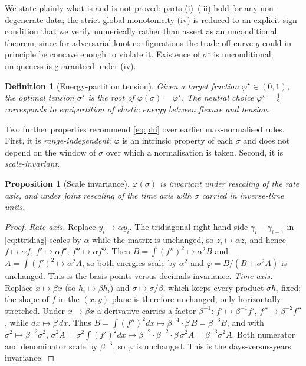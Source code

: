 \documentclass[10pt]{article}
\newtheorem{proposition}{Proposition}
\newtheorem{definition}{Definition}
\begin{document}
We state plainly what is and is not proved: parts (i)--(iii) hold for any non-degenerate data;
the strict global monotonicity (iv) is reduced to an explicit sign condition that we verify
numerically rather than assert as an unconditional theorem, since for adversarial knot
configurations the trade-off curve $g$ could in principle be concave enough to violate it.
Existence of $\sigma^\star$ is unconditional; uniqueness is guaranteed under (iv).

\begin{definition}[Energy-partition tension]
Given a target fraction $\varphi^\star\in(0,1)$, the optimal tension $\sigma^\star$ is the
root of $\varphi(\sigma)=\varphi^\star$. The neutral choice $\varphi^\star=\tfrac12$
corresponds to \emph{equipartition} of elastic energy between flexure and tension.
\end{definition}

Two further properties recommend \eqref{eq:phi} over earlier max-normalised rules. First, it is
\emph{range-independent}: $\varphi$ is an intrinsic property of each $\sigma$ and does not
depend on the window of $\sigma$ over which a normalisation is taken. Second, it is
\emph{scale-invariant}.

\begin{proposition}[Scale invariance]\label{prop:inv}
$\varphi(\sigma)$ is invariant under rescaling of the rate axis, and under joint rescaling of
the time axis with $\sigma$ carried in inverse-time units.
\end{proposition}
\begin{proof}
\emph{Rate axis.} Replace $y_i\mapsto\alpha y_i$. The tridiagonal right-hand side
$\gamma_i-\gamma_{i-1}$ in \eqref{eq:ttridiag} scales by $\alpha$ while the matrix is unchanged,
so $z_i\mapsto\alpha z_i$ and hence $f\mapsto\alpha f$, $f'\mapsto\alpha f'$, $f''\mapsto\alpha f''$.
Then $B=\int(f'')^2\mapsto\alpha^2 B$ and $A=\int(f')^2\mapsto\alpha^2 A$, so both energies scale
by $\alpha^2$ and $\varphi=B/(B+\sigma^2A)$ is unchanged. This is the basis-points-versus-decimals
invariance.
\emph{Time axis.} Replace $x\mapsto\beta x$ (so $h_i\mapsto\beta h_i$) and $\sigma\mapsto\sigma/\beta$,
which keeps every product $\sigma h_i$ fixed; the shape of $f$ in the $(x,y)$ plane is therefore
unchanged, only horizontally stretched. Under $x\mapsto\beta x$ a derivative carries a factor
$\beta^{-1}$: $f'\mapsto\beta^{-1}f'$, $f''\mapsto\beta^{-2}f''$, while $dx\mapsto\beta\,dx$. Thus
$B=\int(f'')^2dx\mapsto\beta^{-4}\cdot\beta\,B=\beta^{-3}B$, and with $\sigma^2\mapsto\beta^{-2}\sigma^2$,
$\sigma^2 A=\sigma^2\!\int(f')^2dx\mapsto\beta^{-2}\cdot\beta^{-2}\cdot\beta\,\sigma^2A=\beta^{-3}\sigma^2A$.
Both numerator and denominator scale by $\beta^{-3}$, so $\varphi$ is unchanged. This is the
days-versus-years invariance.
\end{proof}
\end{document}
